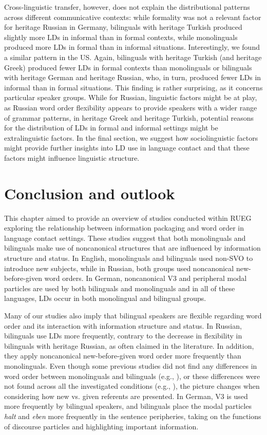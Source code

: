 \documentclass[output=paper,colorlinks,citecolor=brown]{langscibook}
\begin{document}
Cross-linguistic transfer, however, does not explain the distributional patterns across different communicative contexts: while formality was not a relevant factor for heritage Russian in Germany, bilinguals with heritage Turkish produced slightly more LDs in informal than in formal contexts, while monolinguals produced more LDs in formal than in informal situations. Interestingly, we found a similar pattern in the US. Again, bilinguals with heritage Turkish (and heritage Greek) produced fewer LDs in formal contexts than monolinguals or bilinguals with heritage German and heritage Russian, who, in turn, produced fewer LDs in informal than in formal situations. This finding is rather surprising, as it concerns particular speaker groups. While for Russian, linguistic factors might be at play, as Russian word order flexibility appears to provide speakers with a wider range of grammar patterns, in heritage Greek and heritage Turkish, potential reasons for the distribution of LDs in formal and informal settings might be extralinguistic factors. In the final section, we suggest how sociolinguistic factors might provide further insights into LD use in language contact and that these factors might influence linguistic structure.  


\section{Conclusion and outlook}\label{sec:bunk-conclusion}

This chapter aimed to provide an overview of studies conducted within RUEG exploring the relationship between information packaging and word order in language contact settings. These studies suggest that both monolinguals and bilinguals make use of noncanonical structures that are influenced by information structure and status. In English, monolinguals and bilinguals used non-SVO to introduce new subjects, while in Russian, both groups used noncanonical new-before-given word orders. In German, noncanonical V3 and peripheral modal particles are used by both bilinguals and monolinguals and in all of these languages, LDs occur in both monolingual and bilingual groups.

Many of our studies also imply that bilingual speakers are flexible regarding word order and its interaction with information structure and status. In Russian, bilinguals use LDs more frequently, contrary to the decrease in flexibility in bilinguals with heritage Russian, as often claimed in the literature. In addition, they apply noncanonical new-before-given word order more frequently than monolinguals. Even though some previous studies did not find any differences in word order between monolinguals and bilinguals (e.g., \cite{martynova_ovvo_nodate}), or these differences were not found across all the investigated conditions (e.g., \cite{zuban_word_2021}), the picture changes when considering how new vs. given referents are presented. In German, V3 is used more frequently by bilingual speakers, and bilinguals place the modal particles \textit{halt} and \textit{eben} more frequently in the sentence peripheries, taking on the functions of discourse particles and highlighting important information.
\end{document}
